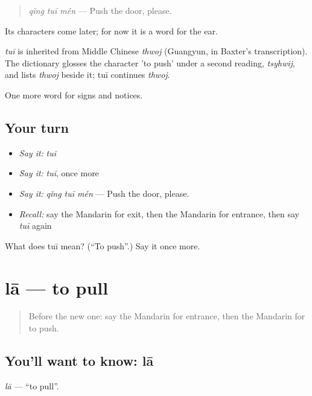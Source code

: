 \begin{quote}
\emph{qǐng tuī mén} — Push the door, please.
\end{quote}

Its characters come later; for now it is a word for the ear.

\begin{cousinweb}
\emph{tuī} is inherited from Middle Chinese \emph{thwoj} (Guangyun, in Baxter's transcription). The dictionary glosses the character 'to push' under a second reading, \emph{tsyhwij}, and lists \emph{thwoj} beside it; tuī continues \emph{thwoj}.
\end{cousinweb}

\begin{grammarlens}[title={What you've built}]
One more word for signs and notices.
\end{grammarlens}

\subsection*{Your turn}
\begin{itemize}
\raggedright
  \item \emph{Say it:} \emph{tuī}
  \item \emph{Say it:} \emph{tuī}, once more
  \item \emph{Say it:} \emph{qǐng tuī mén} — Push the door, please.
  \item \emph{Recall:} say the Mandarin for exit, then the Mandarin for entrance, then say \emph{tuī} again
\end{itemize}

\begin{tcolorbox}[breakable,colback=teal!4,colframe=teal!35!black,title={Before you move on}]
What does tuī mean? (\textquotedblleft{}To push\textquotedblright{}.) Say it once more.
\end{tcolorbox}
\section[lā]{lā — to pull}

\label{lesson:ZH-C112-la}



\begin{quote}
Before the new one: say the Mandarin for entrance, then the Mandarin for to push.
\end{quote}

\subsection*{You'll want to know: lā}
\emph{lā} — \textquotedblleft{}to pull\textquotedblright{}.

